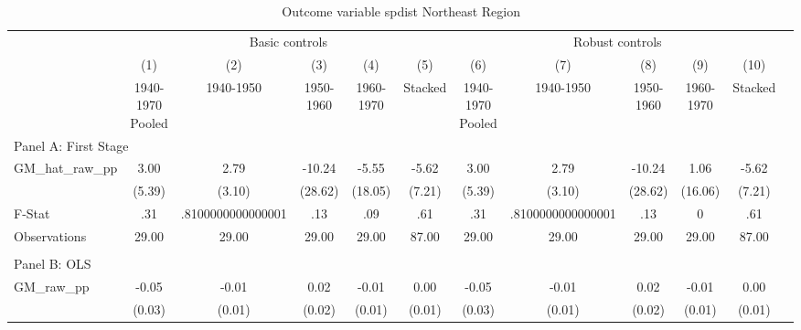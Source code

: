  \begin{table}[htbp]\centering {} \begin{threeparttable} \caption{Outcome variable spdist Northeast Region} \begin{tabular}{l*{11}{c}} \toprule
          &\multicolumn{5}{c}{Basic controls}                                   &\multicolumn{5}{c}{Robust controls}                                  \\\cmidrule(lr){2-6}\cmidrule(lr){7-11}
          &\multicolumn{1}{c}{(1)}&\multicolumn{1}{c}{(2)}&\multicolumn{1}{c}{(3)}&\multicolumn{1}{c}{(4)}&\multicolumn{1}{c}{(5)}&\multicolumn{1}{c}{(6)}&\multicolumn{1}{c}{(7)}&\multicolumn{1}{c}{(8)}&\multicolumn{1}{c}{(9)}&\multicolumn{1}{c}{(10)}\\
          &\multicolumn{1}{c}{1940-1970 Pooled}&\multicolumn{1}{c}{1940-1950}&\multicolumn{1}{c}{1950-1960}&\multicolumn{1}{c}{1960-1970}&\multicolumn{1}{c}{Stacked}&\multicolumn{1}{c}{1940-1970 Pooled}&\multicolumn{1}{c}{1940-1950}&\multicolumn{1}{c}{1950-1960}&\multicolumn{1}{c}{1960-1970}&\multicolumn{1}{c}{Stacked}\\
\cmidrule(lr){1-11}
\multicolumn{10}{l}{Panel A: First Stage}\\
\cmidrule(lr){1-11}
GM\_hat\_raw\_pp&      3.00   &      2.79   &    -10.24   &     -5.55   &     -5.62   &      3.00   &      2.79   &    -10.24   &      1.06   &     -5.62   \\
          &    (5.39)   &    (3.10)   &   (28.62)   &   (18.05)   &    (7.21)   &    (5.39)   &    (3.10)   &   (28.62)   &   (16.06)   &    (7.21)   \\
\midrule
F-Stat    &       .31   &.8100000000000001   &       .13   &       .09   &       .61   &       .31   &.8100000000000001   &       .13   &         0   &       .61   \\
Observations&     29.00   &     29.00   &     29.00   &     29.00   &     87.00   &     29.00   &     29.00   &     29.00   &     29.00   &     87.00   \\
\cmidrule[\heavyrulewidth](lr){1-11} \\ \cmidrule[\heavyrulewidth](lr){1-11}
\multicolumn{10}{l}{Panel B: OLS}\\
\cmidrule(lr){1-11}
GM\_raw\_pp &     -0.05   &     -0.01   &      0.02   &     -0.01   &      0.00   &     -0.05   &     -0.01   &      0.02   &     -0.01   &      0.00   \\
          &    (0.03)   &    (0.01)   &    (0.02)   &    (0.01)   &    (0.01)   &    (0.03)   &    (0.01)   &    (0.02)   &    (0.01)   &    (0.01)   \\

\end{tabular}
\end{threeparttable}
\end{table}
